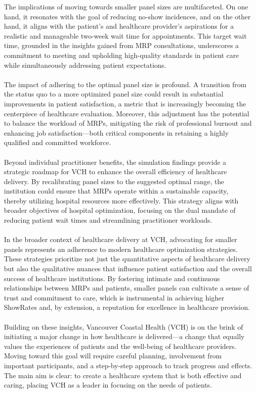 \documentclass[11pt]{article}
\theoremstyle{definition}
\begin{document}
The implications of moving towards smaller panel sizes are multifaceted. On one hand, it resonates with the goal of reducing no-show incidences, and on the other hand, it aligns with the patient's and healthcare provider's aspirations for a realistic and manageable two-week wait time for appointments. This target wait time, grounded in the insights gained from MRP consultations, underscores a commitment to meeting and upholding high-quality standards in patient care while simultaneously addressing patient expectations.\\\\
The impact of adhering to the optimal panel size is profound. A transition from the status quo to a more optimized panel size could result in substantial improvements in patient satisfaction, a metric that is increasingly becoming the centerpiece of healthcare evaluation. Moreover, this adjustment has the potential to balance the workload of MRPs, mitigating the risk of professional burnout and enhancing job satisfaction—both critical components in retaining a highly qualified and committed workforce.\\\\
Beyond individual practitioner benefits, the simulation findings provide a strategic roadmap for VCH to enhance the overall efficiency of healthcare delivery. By recalibrating panel sizes to the suggested optimal range, the institution could ensure that MRPs operate within a sustainable capacity, thereby utilizing hospital resources more effectively. This strategy aligns with broader objectives of hospital optimization, focusing on the dual mandate of reducing patient wait times and streamlining practitioner workloads.\\\\
In the broader context of healthcare delivery at VCH, advocating for smaller panels represents an adherence to modern healthcare optimization strategies. These strategies prioritize not just the quantitative aspects of healthcare delivery but also the qualitative nuances that influence patient satisfaction and the overall success of healthcare institutions. By fostering intimate and continuous relationships between MRPs and patients, smaller panels can cultivate a sense of trust and commitment to care, which is instrumental in achieving higher ShowRates and, by extension, a reputation for excellence in healthcare provision.\\\\
Building on these insights, Vancouver Coastal Health (VCH) is on the brink of initiating a major change in how healthcare is delivered—a change that equally values the experiences of patients and the well-being of healthcare providers. Moving toward this goal will require careful planning, involvement from important participants, and a step-by-step approach to track progress and effects. The main aim is clear: to create a healthcare system that is both effective and caring, placing VCH as a leader in focusing on the needs of patients.
\end{document}
